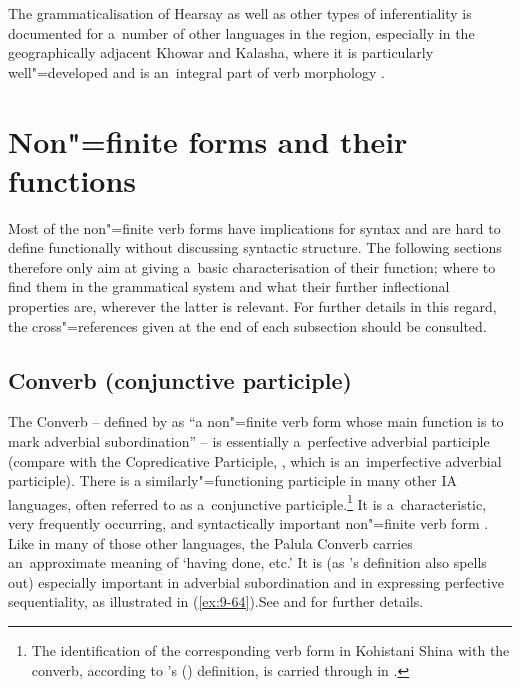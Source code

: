 The grammaticalisation of Hearsay as well as other types of inferentiality is documented for a~number of other languages in the region, especially in the geographically adjacent Khowar and Kalasha, where it is particularly well"=developed and is an~integral part of verb morphology \citep{bashir1996}. 


\section{Non"=finite forms and their functions}
\label{sec:9-3}

Most of the non"=finite verb forms have implications for syntax and are hard to define functionally without discussing syntactic structure. The following sections therefore only aim at giving a~basic characterisation of their function; where to find them in the grammatical system and what their further inflectional properties are, wherever the latter is relevant. For further details in this regard, the cross"=references given at the end of each subsection should be consulted. 


\subsection{Converb (conjunctive participle) }
\label{subsec:9-3-1}


The Converb -- defined by \citet{haspelmath1995} as ``a non"=finite verb form whose main function is to mark adverbial subordination'' -- is essentially a~perfective adverbial participle (compare with the Copredicative Participle, , which is an~imperfective adverbial participle). There is a similarly"=functioning participle in many other IA languages, often referred to as a~conjunctive participle.\footnote{The identification of the corresponding verb form in Kohistani Shina with the converb, according to \citeauthor{haspelmath1995}'s (\citeyear{haspelmath1995}) definition, is carried through in \citealt{schmidt2003}.} It is  a~characteristic, very frequently occurring, and syntactically important non"=finite verb form \citep[323, 397--401]{masica1991}. Like in many of those other languages, the Palula Converb carries an~approximate meaning of `having done, etc.' It is (as \citeauthor{haspelmath1995}'s definition also spells out) especially important in adverbial subordination and in expressing perfective sequentiality, as illustrated in (\ref{ex:9-64}).See  and  for further details.

